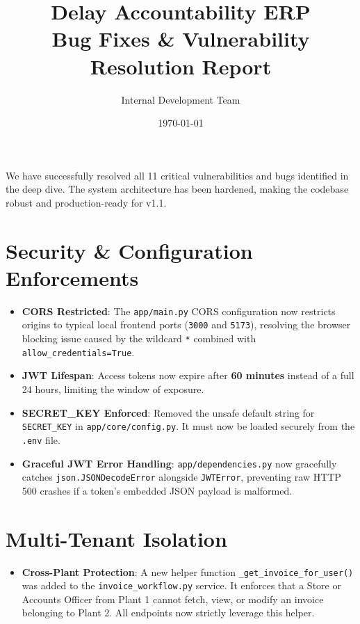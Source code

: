 \documentclass[11pt,a4paper]{article}
\title{\textbf{Delay Accountability ERP}\\ \Large Bug Fixes \& Vulnerability Resolution Report}
\author{Internal Development Team}
\date{\today}
\newcommand{\code}[1]{\colorbox{codebg}{\texttt{#1}}}
\begin{document}
\maketitle

\begin{tcolorbox}[colback=success!10, colframe=success, title=Executive Summary]
We have successfully resolved all 11 critical vulnerabilities and bugs identified in the deep dive. The system architecture has been hardened, making the codebase robust and production-ready for v1.1.
\end{tcolorbox}

\vspace{1em}

\section{Security \& Configuration Enforcements}
\begin{itemize}[leftmargin=*, itemsep=0.8em]
    \item \textbf{CORS Restricted}: The \code{app/main.py} CORS configuration now restricts origins to typical local frontend ports (\code{3000} and \code{5173}), resolving the browser blocking issue caused by the wildcard \code{*} combined with \code{allow\_credentials=True}.
    \item \textbf{JWT Lifespan}: Access tokens now expire after \textbf{60 minutes} instead of a full 24 hours, limiting the window of exposure.
    \item \textbf{SECRET\_KEY Enforced}: Removed the unsafe default string for \code{SECRET\_KEY} in \code{app/core/config.py}. It must now be loaded securely from the \code{.env} file.
    \item \textbf{Graceful JWT Error Handling}: \code{app/dependencies.py} now gracefully catches \code{json.JSONDecodeError} alongside \code{JWTError}, preventing raw HTTP 500 crashes if a token's embedded JSON payload is malformed.
\end{itemize}

\section{Multi-Tenant Isolation}
\begin{itemize}[leftmargin=*, itemsep=0.8em]
    \item \textbf{Cross-Plant Protection}: A new helper function \code{\_get\_invoice\_for\_user()} was added to the \code{invoice\_workflow.py} service. It enforces that a Store or Accounts Officer from Plant 1 cannot fetch, view, or modify an invoice belonging to Plant 2. All endpoints now strictly leverage this helper.
\end{itemize}
\end{document}
